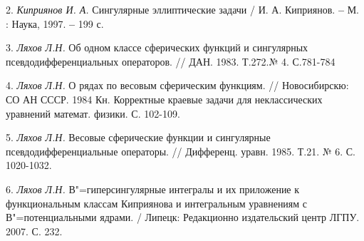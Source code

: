 2. {\it Киприянов И. А.} Сингулярные эллиптические задачи / И. А. Киприянов.
{\bf --} М. : Наука, 1997. {\bf --} 199 с.

3. {\it Ляхов Л.Н.} Об одном классе сферических функций и сингулярных псевдодифференциальных операторов. // ДАН. 1983. Т.272.№ 4. С.781-784

4. {\it Ляхов Л.Н.} О рядах по весовым сферическим функциям. //
Новосибирскю: СО АН СССР. 1984
Кн. Корректные краевые задачи для неклассических уравнений математ. физики. С. 102-109.

5. {\it Ляхов Л.Н.} Весовые сферические функции и сингулярные псевдодифференциальные операторы.
// Дифференц. уравн. 1985. Т.21. № 6. С. 1020-1032.

6. {\it Ляхов Л.Н. }
В"=гиперсингулярные интегралы и их приложение к функциональным классам Киприянова и интегральным уравнениям с В"=потенциальными ядрами.
/ Липецк: Редакционно издательский центр ЛГПУ. 2007. С. 232.
